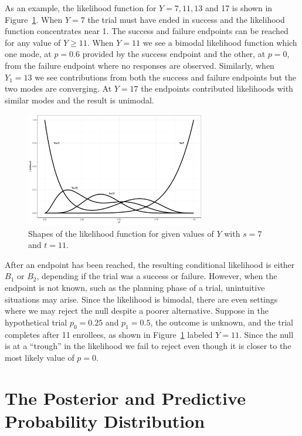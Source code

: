\documentclass[sii]{ipart}
\begin{document}
As an example, the likelihood function for $Y = 7, 11, 13$ and 17 is shown in
Figure~\ref{likelihood.fig}. When $Y = 7$ the trial must have ended in success and the likelihood function concentrates near 1. The success and
failure endpoints can be reached for any value of $Y \geq 11$. When 
$Y = 11$ we see a bimodal likelihood function which one mode, at $p=0.6$
provided by the success endpoint and the other, at $p=0$, from the
failure endpoint where no responses are observed. Similarly, when $Y_1=13$
we see contributions from both the success and failure endpoints but
the two modes are converging. At $Y=17$ the endpoints contributed likelihoods with similar modes and the result is unimodal.

\begin{figure}%
\centering
\includegraphics[width=0.7\textwidth]{likelihood.pdf}
\caption{Shapes of the likelihood function for given values of $Y$ with 
$s=7$ and $t=11$.}
\label{likelihood.fig}
\end{figure}

After an endpoint has been reached, the resulting conditional likelihood is either $B_1$ or $B_2$, depending if the trial was a success or failure. However, when the endpoint is not known, such as the planning phase of a trial, unintuitive situations may arise. Since the likelihood is bimodal, there are even settings where we may reject the null despite a poorer alternative. Suppose in the hypothetical trial $p_0=0.25$ and $p_1=0.5$, the outcome is unknown, and the trial completes after 11 enrollees, as shown in Figure~\ref{likelihood.fig} labeled $Y=11$. Since the null is at a ``trough'' in the likelihood we fail to reject even though it is closer to the most likely value of $p=0$. 

\section{The Posterior and Predictive Probability Distribution} \label{bayesian_extension}
\end{document}
